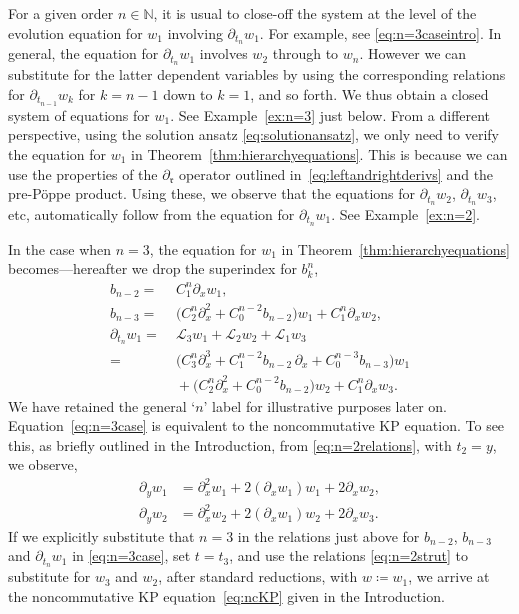 \documentclass[5p,twocolumn]{elsarticle}
\newcommand*{\pa}{{\partial}}
\newcommand*{\rl}{\mathfrak r}
\begin{document}
%
\begin{remark}
  For a given order $n\in\mathbb N$, it is usual to close-off the system at the level of the evolution equation for $w_1$ involving $\pa_{t_n}w_1$.
  For example, see \eqref{eq:n=3caseintro}. In general, the equation for $\pa_{t_n}w_1$ involves $w_2$ through to $w_n$.
  However we can substitute for the latter dependent variables by using the corresponding relations for $\pa_{t_{n-1}}w_k$ for $k=n-1$ down to $k=1$, and so forth.
  We thus obtain a closed system of equations for $w_1$. See Example~\ref{ex:n=3} just below.
  From a different perspective, using the solution ansatz \eqref{eq:solutionansatz}, we only need to verify the equation for $w_1$ in Theorem~\ref{thm:hierarchyequations}.
  This is because we can use the properties of the $\pa_\rl$ operator outlined in~\eqref{eq:leftandrightderivs} and the pre-P\"oppe product.
  Using these, we observe that the equations for $\pa_{t_n}w_2$, $\pa_{t_n}w_3$, etc, automatically follow from the equation for $\pa_{t_n}w_1$.
  See Example~\ref{ex:n=2}. 
\end{remark}
%
\begin{example}[KP equation]\label{ex:n=3}
  In the case when $n=3$, the equation for $w_1$ in Theorem~\ref{thm:hierarchyequations} becomes---hereafter we drop the superindex for $b_k^n$,
  \begin{subequations}
  \begin{align}
     b_{n-2}=&\;C_{1}^n\pa_x w_1,\label{eq:n=3casebn2}\\
     b_{n-3}=&\;\bigl(C_{2}^n\pa_x^2+C_{0}^{n-2}b_{n-2}\bigr)w_1+C_{1}^n\pa_xw_2,\label{eq:n=3casebn3}\\
     \pa_{t_n}w_1=&\;\mathcal L_3w_1+\mathcal L_2w_2+\mathcal L_1w_3\nonumber\\
                =&\;\bigl(C_{3}^n\pa_x^3+C_{1}^{n-2}b_{n-2}\,\pa_x+C_{0}^{n-3}b_{n-3}\bigr)w_1\nonumber\\
                 &\;+\bigl(C_{2}^n\pa_x^2+C_{0}^{n-2}b_{n-2}\bigr)w_2+C_{1}^n\pa_xw_3.\label{eq:n=3case}
  \end{align}
  \end{subequations}
  We have retained the general `$n$' label for illustrative purposes later on.
  Equation~\eqref{eq:n=3case} is equivalent to the noncommutative KP equation.
  To see this, as briefly outlined in the Introduction, from \eqref{eq:n=2relations}, with $t_2=y$, we observe,
  \begin{subequations}\label{eq:n=2strut}
  \begin{align}
    \pa_{y}w_1&=\pa_x^2w_1+2(\pa_xw_1)w_1+2\pa_xw_{2},\\
    \pa_{y}w_2&=\pa_x^2w_2+2(\pa_xw_1)w_2+2\pa_xw_{3}.
  \end{align}
  \end{subequations}
  If we explicitly substitute that $n=3$ in the relations just above for $b_{n-2}$, $b_{n-3}$ and $\pa_{t_n}w_1$ in \eqref{eq:n=3case},
  set $t=t_3$, and use the relations \eqref{eq:n=2strut} to substitute for $w_3$ and $w_2$, after standard reductions,
  with $w\coloneqq w_1$, we arrive at the noncommutative KP equation~\eqref{eq:ncKP} given in the Introduction.
\end{example}
\end{document}

